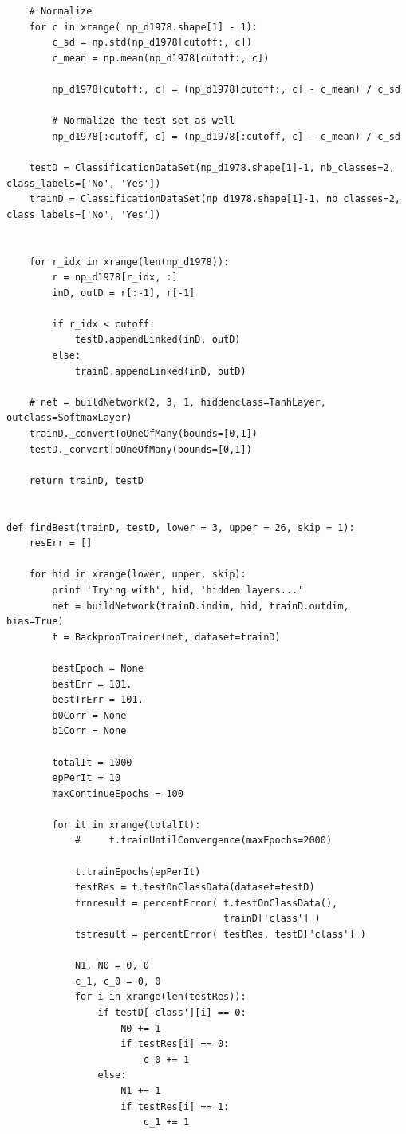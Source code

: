 \documentclass[a4paper]{article}
\theoremstyle{plain}
\begin{document}
\begin{lstlisting}
    # Normalize
    for c in xrange( np_d1978.shape[1] - 1):
        c_sd = np.std(np_d1978[cutoff:, c])
        c_mean = np.mean(np_d1978[cutoff:, c])

        np_d1978[cutoff:, c] = (np_d1978[cutoff:, c] - c_mean) / c_sd

        # Normalize the test set as well
        np_d1978[:cutoff, c] = (np_d1978[:cutoff, c] - c_mean) / c_sd   

    testD = ClassificationDataSet(np_d1978.shape[1]-1, nb_classes=2, class_labels=['No', 'Yes'])
    trainD = ClassificationDataSet(np_d1978.shape[1]-1, nb_classes=2, class_labels=['No', 'Yes'])    
    

    for r_idx in xrange(len(np_d1978)):
        r = np_d1978[r_idx, :]
        inD, outD = r[:-1], r[-1]

        if r_idx < cutoff:
            testD.appendLinked(inD, outD)
        else:
            trainD.appendLinked(inD, outD)

    # net = buildNetwork(2, 3, 1, hiddenclass=TanhLayer, outclass=SoftmaxLayer)
    trainD._convertToOneOfMany(bounds=[0,1])
    testD._convertToOneOfMany(bounds=[0,1])
    
    return trainD, testD


def findBest(trainD, testD, lower = 3, upper = 26, skip = 1):
    resErr = []

    for hid in xrange(lower, upper, skip):
        print 'Trying with', hid, 'hidden layers...'
        net = buildNetwork(trainD.indim, hid, trainD.outdim, bias=True)
        t = BackpropTrainer(net, dataset=trainD)    

        bestEpoch = None
        bestErr = 101.
        bestTrErr = 101.
        b0Corr = None
        b1Corr = None

        totalIt = 1000
        epPerIt = 10
        maxContinueEpochs = 100

        for it in xrange(totalIt):    
            #     t.trainUntilConvergence(maxEpochs=2000)

            t.trainEpochs(epPerIt)
            testRes = t.testOnClassData(dataset=testD)
            trnresult = percentError( t.testOnClassData(),
                                      trainD['class'] )
            tstresult = percentError( testRes, testD['class'] )

            N1, N0 = 0, 0
            c_1, c_0 = 0, 0
            for i in xrange(len(testRes)):
                if testD['class'][i] == 0:
                    N0 += 1
                    if testRes[i] == 0:
                        c_0 += 1
                else:
                    N1 += 1
                    if testRes[i] == 1:
                        c_1 += 1


\end{lstlisting}
\end{document}

